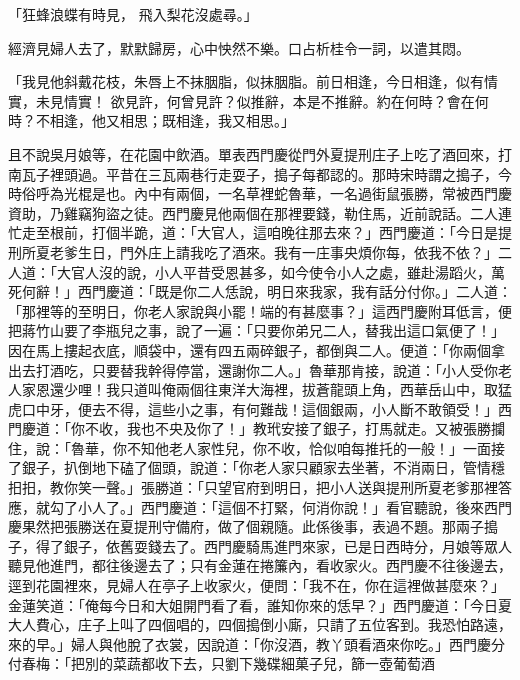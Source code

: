 \begin{showcontents}{}
「狂蜂浪蝶有時見，  飛入梨花沒處尋。」

經濟見婦人去了，默默歸房，心中怏然不樂。口占析桂令一詞，以遣其悶。

「我見他斜戴花枝，朱唇上不抹胭脂，似抹胭脂。前日相逢，今日相逢，似有情實，未見情實！  欲見許，何曾見許？似推辭，本是不推辭。約在何時？會在何時？不相逢，他又相思；既相逢，我又相思。」

且不說吳月娘等，在花園中飲酒。單表西門慶從門外夏提刑庄子上吃了酒回來，打南瓦子裡頭過。平昔在三瓦兩巷行走耍子，搗子每都認的。那時宋時謂之搗子，今時俗呼為光棍是也。內中有兩個，一名草裡蛇魯華，一名過街鼠張勝，常被西門慶資助，乃雞竊狗盜之徒。西門慶見他兩個在那裡要錢，勒住馬，近前說話。二人連忙走至根前，打個半跪，道：「大官人，這咱晚往那去來？」西門慶道：「今日是提刑所夏老爹生日，門外庄上請我吃了酒來。我有一庄事央煩你每，依我不依？」二人道：「大官人沒的說，小人平昔受恩甚多，如今使令小人之處，雖赴湯蹈火，萬死何辭！」西門慶道：「既是你二人恁說，明日來我家，我有話分付你。」二人道：「那裡等的至明日，你老人家說與小罷！端的有甚麼事？」這西門慶附耳低言，便把蔣竹山要了李瓶兒之事，說了一遍：「只要你弟兄二人，替我出這口氣便了！」因在馬上摟起衣底，順袋中，還有四五兩碎銀子，都倒與二人。便道：「你兩個拿出去打酒吃，只要替我幹得停當，還謝你二人。」魯華那肯接，說道：「小人受你老人家恩還少哩！我只道叫俺兩個往東洋大海裡，拔蒼龍頭上角，西華岳山中，取猛虎口中牙，便去不得，這些小之事，有何難哉！這個銀兩，小人斷不敢領受！」西門慶道：「你不收，我也不央及你了！」教玳安接了銀子，打馬就走。又被張勝攔住，說：「魯華，你不知他老人家性兒，你不收，恰似咱每推托的一般！」一面接了銀子，扒倒地下磕了個頭，說道：「你老人家只顧家去坐著，不消兩日，管情穩抇抇，教你笑一聲。」張勝道：「只望官府到明日，把小人送與提刑所夏老爹那裡答應，就勾了小人了。」西門慶道：「這個不打緊，何消你說！」看官聽說，後來西門慶果然把張勝送在夏提刑守備府，做了個親隨。此係後事，表過不題。那兩子搗子，得了銀子，依舊耍錢去了。西門慶騎馬進門來家，已是日西時分，月娘等眾人聽見他進門，都往後邊去了；只有金蓮在捲簾內，看收家火。西門慶不往後邊去，逕到花園裡來，見婦人在亭子上收家火，便問：「我不在，你在這裡做甚麼來？」金蓮笑道：「俺每今日和大姐開門看了看，誰知你來的恁早？」西門慶道：「今日夏大人費心，庄子上叫了四個唱的，四個搗倒小廝，只請了五位客到。我恐怕路遠，來的早。」婦人與他脫了衣裳，因說道：「你沒酒，教丫頭看酒來你吃。」西門慶分付春梅：「把別的菜蔬都收下去，只劉下幾碟細菓子兒，篩一壺葡萄酒 
\end{showcontents}
